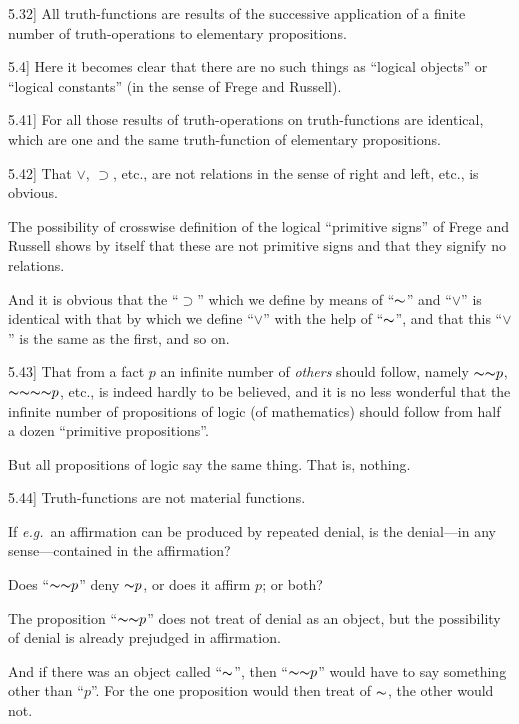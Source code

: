 \documentclass[12pt,oneside]{book}[2007/10/19]
\newcommand{\PropositionE}[2]{%
  \item[\phantomsection\label{PropE:#1}\PropGRef{#1}] #2%
}
\newcommand{\PropGRef}[1]{\hyperref[PropG:#1]{#1}}
\newcommand{\Not}[1]{\mathord{\thicksim} #1}
\newcommand{\Implies}{\supset}
\newcommand{\exempliGratia}{\textit{e.g.}}
\begin{document}
\begin{propositions}
\PropositionE{5.32}
{All truth-functions are results of the successive
application of a finite number of truth-operations
to elementary propositions.}


\PropositionE{5.4}
{Here it becomes clear that there are no such
things as ``logical objects'' or ``logical constants''
(in the sense of Frege and Russell).}


\PropositionE{5.41}
{For all those results of truth-operations on truth-functions
are identical, which are one and the same
truth-function of elementary propositions.}


\PropositionE{5.42}
{That $\lor$, $\Implies$, etc., are not relations in the sense of
right and left, etc., is obvious.

The possibility of crosswise definition of the
logical ``primitive signs'' of Frege and Russell
shows by itself that these are not primitive signs
and that they signify no relations.

And it is obvious that the ``$\Implies$'' which we define
by means of ``$\Not{}$'' and ``$\lor$'' is identical with that
by which we define ``$\lor$'' with the help of ``$\Not{}$'', and
that this ``$\lor$'' is the same as the first, and
so on.}


\PropositionE{5.43}
{That from a fact $p$ an infinite number of \emph{others}
should follow, namely $\Not{\Not{p}}$, $\Not{\Not{\Not{\Not{p}}}}$, etc., is
indeed hardly to be believed, and it is no less
wonderful that the infinite number of propositions
of logic (of mathematics) should follow from half
a dozen ``primitive propositions''.

But all propositions of logic say the same thing.
That is, nothing.}


\PropositionE{5.44}
{Truth-functions are not material functions.

If \exempliGratia\ an affirmation can be produced by
repeated denial, is the denial---in any sense---contained
in the affirmation?

Does ``$\Not{\Not{p}}$'' deny $\Not{p}$, or does it affirm $p$;
or both?

The proposition ``$\Not{\Not{p}}$'' does not treat of
denial as an object, but the possibility of denial is
already prejudged in affirmation.

And if there was an object called ``$\Not{}$'', then
``$\Not{\Not{p}}$'' would have to say something other than
``$p$''. For the one proposition would then treat
of $\Not{}$, the other would not.}



\end{propositions}
\end{document}
